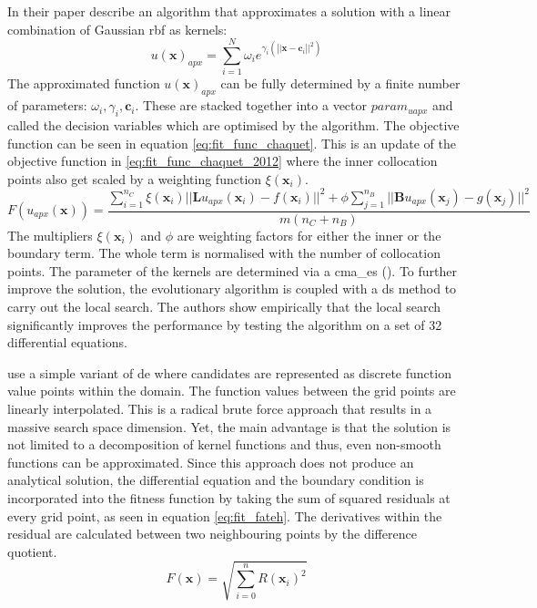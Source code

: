 \documentclass[./\jobname.tex]{subfiles}
\begin{document}
In their paper \cite{chaquet_using_2019} describe an algorithm that approximates a solution with a linear combination of Gaussian \gls{rbf} as kernels:
\begin{equation}
u(\mathbf{x})_{apx} = \sum_{i=1}^{N} \omega_i e^{\gamma_i (\left||\mathbf{x} - \mathbf{c}_i\right||^2)}
\end{equation}
The approximated function $u(\mathbf{x})_{apx}$ can be fully determined by a finite number of parameters: $\omega_i, \gamma_i, \mathbf{c}_i$. These are stacked together into a vector $param_{uapx}$ and called the decision variables which are optimised by the algorithm. 
The objective function can be seen in equation \eqref{eq:fit_func_chaquet}. This is an update of the objective function in \ref{eq:fit_func_chaquet_2012} where the inner collocation points also get scaled by a weighting function $\xi(\mathbf{x}_i)$.
\begin{equation}
\label{eq:fit_func_chaquet}
F(u_{apx}(\mathbf{x})) = \frac{\sum_{i=1}^{n_C} \xi (\mathbf{x}_i) || \mathbf{L}u_{apx}(\mathbf{x}_i) - f(\mathbf{x}_i)||^2 + \phi \sum_{j=1}^{n_B} || \mathbf{B}u_{apx}(\mathbf{x}_j) - g(\mathbf{x}_j)||^2}{m (n_C + n_B)}  
\end{equation}
The multipliers $\xi(\mathbf{x}_i)$ and $\phi$ are weighting factors for either the inner or the boundary term. The whole term is normalised with the number of collocation points. 
The parameter of the kernels are determined via a \gls{cma_es} (\cite{hansen_cma_2006}). To further improve the solution, the evolutionary algorithm is coupled with a \gls{ds} method to carry out the local search. The authors show empirically that the local search significantly improves the performance by testing the algorithm on a set of 32 differential equations. 

\cite{fateh_differential_2019} use a simple variant of \gls{de} where candidates are represented as discrete function value points within the domain. The function values between the grid points are linearly interpolated. This is a radical brute force approach that results in a massive search space dimension. Yet, the main advantage is that the solution is not limited to a decomposition of kernel functions and thus, even non-smooth functions can be approximated. Since this approach does not produce an analytical solution, the differential equation and the boundary condition is incorporated into the fitness function by taking the sum of squared residuals at every grid point, as seen in equation \eqref{eq:fit_fateh}. The derivatives within the residual are calculated between two neighbouring points by the difference quotient. 
\begin{equation}
\label{eq:fit_fateh}
F(\mathbf{x}) = \sqrt{\sum_{i=0}^{n} R(\mathbf{x}_i)^2}
\end{equation}
\end{document}
